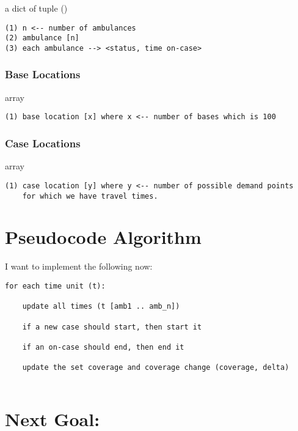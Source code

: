 \documentclass[11pt]{article}
\begin{document}
a dict of tuple ()

\begin{verbatim}
(1) n <-- number of ambulances
(2) ambulance [n]
(3) each ambulance --> <status, time on-case>
\end{verbatim}

\hypertarget{base-locations}{%
\subsubsection{Base Locations}\label{base-locations}}

array

\begin{verbatim}
(1) base location [x] where x <-- number of bases which is 100 
\end{verbatim}

\hypertarget{case-locations}{%
\subsubsection{Case Locations}\label{case-locations}}

array

\begin{verbatim}
(1) case location [y] where y <-- number of possible demand points 
    for which we have travel times. 
\end{verbatim}

    \hypertarget{pseudocode-algorithm}{%
\section{Pseudocode Algorithm}\label{pseudocode-algorithm}}

I want to implement the following now:

\begin{verbatim}
for each time unit (t):
    
    update all times (t [amb1 .. amb_n])
    
    if a new case should start, then start it 
    
    if an on-case should end, then end it
    
    update the set coverage and coverage change (coverage, delta)
    
\end{verbatim}

\hypertarget{next-goal}{%
\section{Next Goal:}\label{next-goal}}
\end{document}

